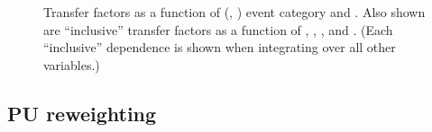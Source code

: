 \begin{figure}[!h]
{  } \\
   ~
   \\
  \caption{\label{fig:tf_muToTtw} Transfer factors as a function of
    (\njet, \nb) event category and \scalht. Also shown are
    ``inclusive'' transfer factors as a function of \njet, \scalht,
    \nb, and \HTmiss. (Each ``inclusive'' dependence is shown when
    integrating over all other variables.) }
\end{figure}

\clearpage
\subsection{PU reweighting}


